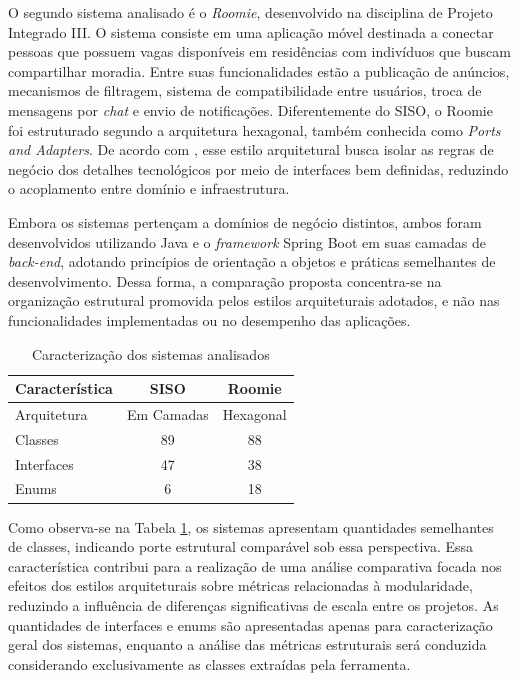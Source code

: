 O segundo sistema analisado é o \textit{Roomie}, desenvolvido na disciplina de Projeto Integrado III. O sistema consiste em uma aplicação
móvel destinada a conectar pessoas que possuem vagas disponíveis em residências com indivíduos que buscam compartilhar moradia. Entre suas
funcionalidades estão a publicação de anúncios, mecanismos de filtragem, sistema de compatibilidade entre usuários, troca de mensagens por 
\textit{chat} e envio de notificações. Diferentemente do SISO, o Roomie foi estruturado segundo a arquitetura hexagonal, também conhecida como 
\textit{Ports and Adapters}. De acordo com , esse estilo arquitetural busca isolar as regras de negócio dos 
detalhes tecnológicos por meio de interfaces bem definidas, reduzindo o acoplamento entre domínio e infraestrutura.

Embora os sistemas pertençam a domínios de negócio distintos, ambos foram desenvolvidos utilizando Java e o \textit{framework} Spring Boot em suas 
camadas de \textit{back-end}, adotando princípios de orientação a objetos e práticas semelhantes de desenvolvimento. Dessa forma, a comparação proposta
concentra-se na organização estrutural promovida pelos estilos arquiteturais adotados, e não nas funcionalidades implementadas ou no
desempenho das aplicações.

\begin{table}[htb]
\centering
\caption{Caracterização dos sistemas analisados}
\label{tab:caracterizacao-sistemas}
\begin{tabular}{|l|c|c|}
\hline
\textbf{Característica} & \textbf{SISO} & \textbf{Roomie} \\ \hline
Arquitetura & Em Camadas & Hexagonal \\ \hline
Classes & 89 & 88 \\ \hline
Interfaces & 47 & 38 \\ \hline
Enums & 6 & 18 \\ \hline
\end{tabular}

\vspace{0.1cm}
\par
{}
\end{table}

Como observa-se na Tabela \ref{tab:caracterizacao-sistemas}, os sistemas apresentam quantidades semelhantes de classes, 
indicando porte estrutural comparável sob essa perspectiva. Essa característica contribui para a realização de uma análise 
comparativa focada nos efeitos dos estilos arquiteturais sobre métricas relacionadas à modularidade, reduzindo a influência 
de diferenças significativas de escala entre os projetos. As quantidades de interfaces e enums são apresentadas apenas para 
caracterização geral dos sistemas, enquanto a análise das métricas estruturais será conduzida considerando exclusivamente 
as classes extraídas pela ferramenta.

